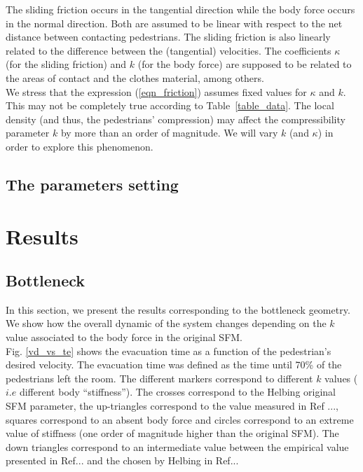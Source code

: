 \documentclass[preprint,12pt]{elsarticle}
\begin{document}
The sliding friction occurs in the tangential direction while the body force 
occurs in the normal direction. Both are assumed to be linear with respect to 
the net distance between contacting pedestrians. The sliding friction is also 
linearly related to the difference between the (tangential) velocities. The 
coefficients $\kappa$ (for the sliding friction) and $k$ (for the 
body force) are supposed to be related to the areas of contact and the clothes 
material, among others. \\

We stress that the expression (\ref{eqn_friction}) assumes fixed values for 
$\kappa$ and $k$. This may not be completely true according to 
Table~\ref{table_data}. The local density (and thus, the pedestrians' 
compression) may affect the compressibility parameter $k$ by more than an order 
of magnitude. We will vary $k$ (and $\kappa$) in order to explore this 
phenomenon. \\  


\subsection{\label{sfm}The parameters setting}



\section{\label{results}Results}


\subsection{\label{bottleneck} Bottleneck}


In this section, we present the results corresponding to the bottleneck geometry. We show how the overall dynamic of the system changes depending on the $k$ value associated to the body force in the original SFM.\\

Fig. \ref{vd_vs_te} shows the evacuation time as a function of the pedestrian's desired velocity. The evacuation time was defined as the time until 70\% of the pedestrians left the room. The different markers correspond to different $k$ values ($i.e$ different body ``stiffness''). The crosses correspond to the Helbing original SFM parameter, the up-triangles correspond to the value measured in Ref ..., squares correspond to an absent body force and circles correspond to an extreme value of stiffness (one order of magnitude higher than the original SFM). The down triangles correspond to an intermediate value between the empirical value presented in Ref... and the chosen by Helbing in Ref...\\
\end{document}
